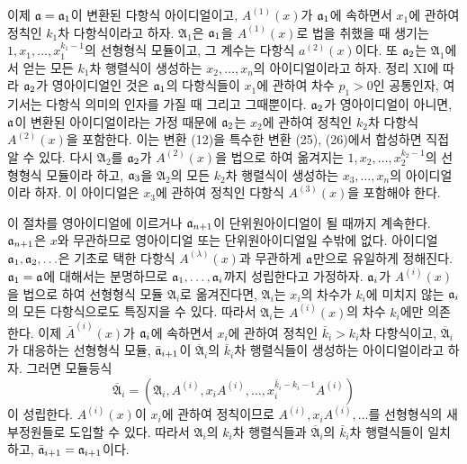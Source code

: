 이제 \(\mathfrak a=\mathfrak a_1\)이 변환된 다항식 아이디얼이고, \(A^{(1)}(x)\)가 \(\mathfrak a_1\)에 속하면서 \(x_1\)에 관하여 정칙인 \(k_1\)차 다항식이라고 하자. \(\mathfrak A_1\)은 \(\mathfrak a_1\)을 \(A^{(1)}(x)\)로 법을 취했을 때 생기는 \(1,x_1,\ldots,x_1^{k_1-1}\)의 선형형식 모듈이고, 그 계수는 다항식 \(a^{(2)}(x)\)이다. 또 \(\mathfrak a_2\)는 \(\mathfrak A_1\)에서 얻는 모든 \(k_1\)차 행렬식이 생성하는 \(x_2,\ldots,x_n\)의 아이디얼이라고 하자. 정리 XI에 따라 \(\mathfrak a_2\)가 영아이디얼인 것은 \(\mathfrak a_1\)의 다항식들이 \(x_1\)에 관하여 차수 \(p_1>0\)인 공통인자, 여기서는 다항식 의미의 인자를 가질 때 그리고 그때뿐이다. \(\mathfrak a_2\)가 영아이디얼이 아니면, \(\mathfrak a\)이 변환된 아이디얼이라는 가정 때문에 \(\mathfrak a_2\)는 \(x_2\)에 관하여 정칙인 \(k_2\)차 다항식 \(A^{(2)}(x)\)을 포함한다. 이는 변환 (12)을 특수한 변환 (25), (26)에서 합성하면 직접 알 수 있다. 다시 \(\mathfrak A_2\)를 \(\mathfrak a_2\)가 \(A^{(2)}(x)\)을 법으로 하여 옮겨지는 \(1,x_2,\ldots,x_2^{k_2-1}\)의 선형형식 모듈이라 하고, \(\mathfrak a_3\)을 \(\mathfrak A_2\)의 모든 \(k_2\)차 행렬식이 생성하는 \(x_3,\ldots,x_n\)의 아이디얼이라 하자. 이 아이디얼은 \(x_3\)에 관하여 정칙인 다항식 \(A^{(3)}(x)\)을 포함해야 한다.

이 절차를 영아이디얼에 이르거나 \(\mathfrak a_{n+1}\)이 단위원아이디얼이 될 때까지 계속한다. \(\mathfrak a_{n+1}\)은 \(x\)와 무관하므로 영아이디얼 또는 단위원아이디얼일 수밖에 없다. 아이디얼 \(\mathfrak a_1,\mathfrak a_2,\ldots\)은 기초로 택한 다항식 \(A^{(\lambda)}(x)\)과 무관하게 \(\mathfrak a\)만으로 유일하게 정해진다. \(\mathfrak a_1=\mathfrak a\)에 대해서는 분명하므로 \(\mathfrak a_1,\ldots,\mathfrak a_i\)까지 성립한다고 가정하자. \(\mathfrak a_i\)가 \(A^{(i)}(x)\)을 법으로 하여 선형형식 모듈 \(\mathfrak A_i\)로 옮겨진다면, \(\mathfrak A_i\)는 \(x_i\)의 차수가 \(k_i\)에 미치지 않는 \(\mathfrak a_i\)의 모든 다항식으로도 특징지을 수 있다. 따라서 \(\mathfrak A_i\)는 \(A^{(i)}(x)\)의 차수 \(k_i\)에만 의존한다. 이제 \(\bar A^{(i)}(x)\)가 \(\mathfrak a_i\)에 속하면서 \(x_i\)에 관하여 정칙인 \(\bar k_i>k_i\)차 다항식이고, \(\overline{\mathfrak A}_i\)가 대응하는 선형형식 모듈, \(\bar{\mathfrak a}_{i+1}\)이 \(\overline{\mathfrak A}_i\)의 \(\bar k_i\)차 행렬식들이 생성하는 아이디얼이라고 하자. 그러면 모듈등식
\[
\overline{\mathfrak A}_i=
(\mathfrak A_i,A^{(i)},x_iA^{(i)},\ldots,
x_i^{\bar k_i-k_i-1}A^{(i)})
\]
이 성립한다. \(A^{(i)}(x)\)이 \(x_i\)에 관하여 정칙이므로 \(A^{(i)},x_iA^{(i)},\ldots\)를 선형형식의 새 부정원들로 도입할 수 있다. 따라서 \(\mathfrak A_i\)의 \(k_i\)차 행렬식들과 \(\overline{\mathfrak A}_i\)의 \(\bar k_i\)차 행렬식들이 일치하고, \(\bar{\mathfrak a}_{i+1}=\mathfrak a_{i+1}\)이다.

